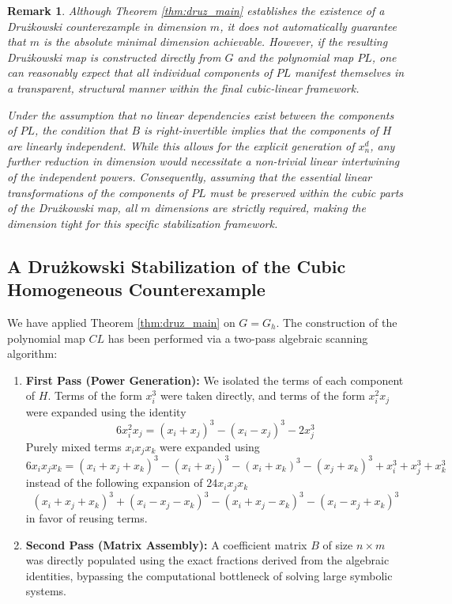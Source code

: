 \documentclass[11pt,a4paper]{article}
\newtheorem{remark}[theorem]{Remark}
\begin{document}
\begin{remark}
Although Theorem \ref{thm:druz_main} establishes the existence of a Drużkowski counterexample in dimension $m$, it does not automatically guarantee that $m$ is the absolute minimal dimension achievable. However, if the resulting Drużkowski map is constructed directly from $G$ and the polynomial map $\mathit{PL}$, one can reasonably expect that all individual components of $\mathit{PL}$ manifest themselves in a transparent, structural manner within the final cubic-linear framework. 

Under the assumption that no linear dependencies exist between the components of $\mathit{PL}$, the condition that $B$ is right-invertible implies that the components of $H$ are linearly independent. While this allows for the explicit generation of $x_n^d$, any further reduction in dimension would necessitate a non-trivial linear intertwining of the independent powers. Consequently, assuming that the essential linear transformations of the components of $\mathit{PL}$ must be preserved within the cubic parts of the Drużkowski map, all $m$ dimensions are strictly required, making the dimension tight for this specific stabilization framework.
\end{remark}

\subsection{A Drużkowski Stabilization of the Cubic Homogeneous Counterexample}

We have applied Theorem \ref{thm:druz_main} on $G = G_h$. The construction of the polynomial map $\mathit{CL}$ has been performed via a two-pass algebraic scanning algorithm:

\begin{enumerate}
    \item \textbf{First Pass (Power Generation):} We isolated the terms of each component of $H$. Terms of the form $x_i^3$ were taken directly, and terms of the form $x_i^2x_j$ were expanded using the identity 
$$
6 x_i^2 x_j = (x_i+x_j)^3 - (x_i-x_j)^3 - 2x_j^3
$$
Purely mixed terms $x_i x_j x_k$ were expanded using 
$$
6 x_i x_j x_k = (x_i + x_j + x_k)^3 - (x_i+x_j)^3 - (x_i+x_k)^3 - (x_j+x_k)^3 + x_i^3 + x_j^3 + x_k^3
$$
instead of the following expansion of $24 x_i x_j x_k$
$$
(x_i + x_j + x_k)^3 + (x_i - x_j - x_k)^3 - (x_i + x_j - x_k)^3 - (x_i - x_j + x_k)^3
$$
in favor of reusing terms.
    \item \textbf{Second Pass (Matrix Assembly):} A coefficient matrix $B$ of size $n \times m$ was directly populated using the exact fractions derived from the algebraic identities, bypassing the computational bottleneck of solving large symbolic systems.
\end{enumerate}
\end{document}
